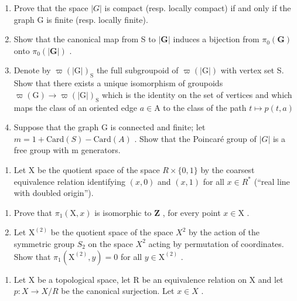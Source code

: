 \begin{enumerate}
\def\labelenumi{\alph{enumi})}
\item
  Prove that the space \(|G|\) is compact (resp. locally compact) if and only if the graph G is finite (resp. locally finite).
\item
  Show that the canonical map from S to \(|\mathbf{G}|\) induces a bijection from \(\pi_0(\mathbf{G})\) onto \(\pi_0(|\mathbf{G}|)\) .
\item
  Denote by \(\varpi(|\mathrm{G}|)_\mathrm{S}\) the full subgroupoid of \(\varpi(|\mathrm{G}|)\) with vertex set S. Show that there exists a unique isomorphism of groupoids \(\varpi (\mathrm{G})\to \varpi (|\mathrm{G}|)_{\mathrm{S}}\) which is the identity on the set of vertices and which maps the class of an oriented edge \(a\in \mathrm{A}\) to the class of the path \(t\mapsto p(t,a)\)
\item
  Suppose that the graph G is connected and finite; let \(m = 1 + \text{Card}(S) - \text{Card}(A)\) . Show that the Poincaré group of \(|G|\) is a free group with m generators.
\end{enumerate}

\begin{enumerate}
\def\labelenumi{\arabic{enumi})}
\setcounter{enumi}{7}
\tightlist
\item
  Let X be the quotient space of the space \(R \times \{0,1\}\) by the coarsest equivalence relation identifying \((x,0)\) and \((x,1)\) for all \(x \in R^{*}\) (“real line with doubled origin”).
\end{enumerate}

\begin{enumerate}
\def\labelenumi{\alph{enumi})}
\item
  Prove that \(\pi_1(\mathrm{X},x)\) is isomorphic to \(\mathbf{Z}\) , for every point \(x\in \mathrm{X}\) .
\item
  Let \(\mathrm{X}^{(2)}\) be the quotient space of the space \(X^{2}\) by the action of the symmetric group \(S_{2}\) on the space \(X^{2}\) acting by permutation of coordinates. Show that \(\pi_{1}(\mathrm{X}^{(2)},y)=0\) for all \(y\in\mathrm{X}^{(2)}\) .
\end{enumerate}

\begin{enumerate}
\def\labelenumi{\arabic{enumi})}
\setcounter{enumi}{8}
\tightlist
\item
  Let X be a topological space, let R be an equivalence relation on X and let \(p: X \to X/R\) be the canonical surjection. Let \(x \in X\) .
\end{enumerate}

